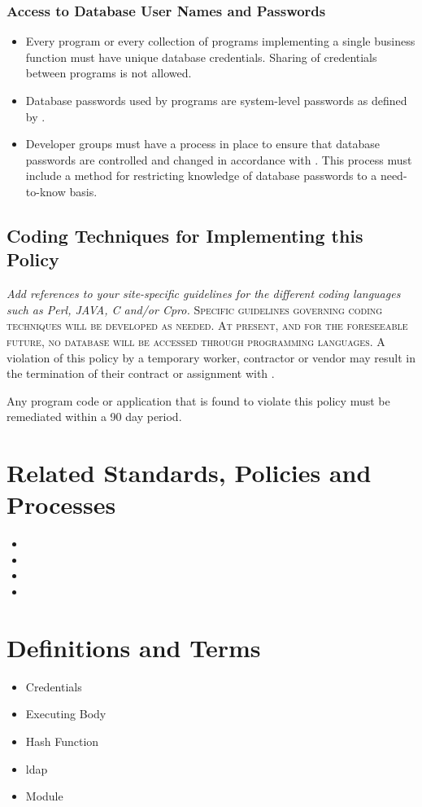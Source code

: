 \subsubsection{Access to Database User Names and Passwords}
\begin{itemize}
\item
Every program or every collection of programs implementing a single business function must have unique database credentials.  
Sharing of credentials between programs is not allowed. 
\item
Database passwords used by programs are system-level passwords as defined by . 
\item
Developer groups must have a process in place to ensure that database passwords are controlled and changed in accordance with .  
This process must include a method for restricting knowledge of database passwords to a need-to-know basis. 
\end{itemize}
\subsection{Coding Techniques for Implementing this Policy}
\textit{Add references to your site-specific guidelines for the different coding languages such as Perl, JAVA, C and/or Cpro.}
\textsc{Specific guidelines governing coding techniques will be developed as needed.  %
At present, and for the foreseeable future, no database will be accessed through programming languages.%
}%
\CommonPolicyCompliance
A violation of this policy by a temporary worker, contractor\oxford{} or vendor may result in the termination of their contract or assignment with \CompanyName{}.

Any program code or application that is found to violate this policy must be remediated within a 90 day period.  
\section{Related Standards, Policies\oxford{} and Processes}
\begin{itemize}
\item {}%
\item {}
\item {}
\item {}
\end{itemize}
\section{Definitions and Terms}
\begin{itemize}
\item
Credentials
\item
Executing Body
\item
Hash Function
\item
\gls{ldap}
\item
Module
\end{itemize}
